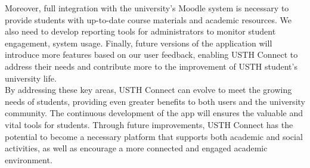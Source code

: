 \documentclass[12pt]{article}
\begin{document}
Moreover, full integration with the university's Moodle system is necessary to provide students with up-to-date course materials and academic resources. 
We also need to develop reporting tools for administrators to monitor student engagement, system usage.
Finally, future versions of the application will introduce more features based on our user feedback, enabling USTH Connect to address their needs and contribute more to the improvement of USTH student's university life. \\

By addressing these key areas, USTH Connect can evolve to meet the growing needs of students, providing even greater benefits to both users and the university community. The continuous development of the app will ensures the valuable and vital tools for students.
Through future improvements, USTH Connect has the potential to become a necessary platform that supports both academic and social activities, as well as encourage a more connected and engaged academic environment.
\end{document}

